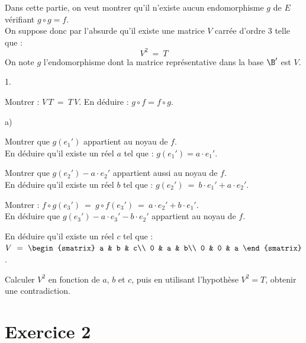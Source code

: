 \documentclass[11pt]{article}%
\begin{document}
\noindent
Dans cette partie, on veut montrer qu'il n'existe aucun endomorphisme $g$ de 
$E$ vérifiant $g \circ g=f$.\\
On suppose donc par l'absurde qu'il existe une matrice $V$ carrée d'ordre 3 
telle que :
\[
V^2 \ = \ T
\]
On note $g$ l'endomorphisme dont la matrice représentative dans la base 
$\B'$ est $V$.
\begin{noliste}{1.}
  \setlength{\itemsep}{4mm}
  \setcounter{enumi}{3}
\item Montrer : $V \, T \ = \  T \, V$. En déduire : $g \circ f= f \circ 
  g$.
  
\item
  \begin{noliste}{a)}
    \setlength{\itemsep}{2mm}
  \item Montrer que $g(e_1')$ appartient au noyau de $f$.\\
    En déduire qu'il existe un réel $a$ tel que : $g(e_1')=a \cdot e_1'$.
    
    
    \newpage
    
    
  \item Montrer que $g(e_2')-a \cdot e_2'$ appartient aussi au noyau
    de $f$.\\
    En déduire qu'il existe un réel $b$ tel que : $g(e_2') \ = \ b
    \cdot e_1' + a \cdot e_2'$.
    
  \item Montrer : $f \circ g (e_3') \ = \ g \circ f (e_3') \ = \ a
    \cdot e_2'+ b \cdot e_1'$.\\
    En déduire que $g(e_3')-a \cdot e_3' - b \cdot e_2'$ appartient au
    noyau de $f$.
    
  \item En déduire qu'il existe un réel $c$ tel que : $V \ = \
    \begin{smatrix}
      a & b & c\\
      0 & a & b\\
      0 & 0 & a
    \end{smatrix}$.
  \end{noliste}
\item Calculer $V^2$ en fonction de $a$, $b$ et $c$, puis en utilisant 
  l'hypothèse $V^2=T$, obtenir une contradiction.
\end{noliste}


\section*{Exercice 2}
\end{document}
